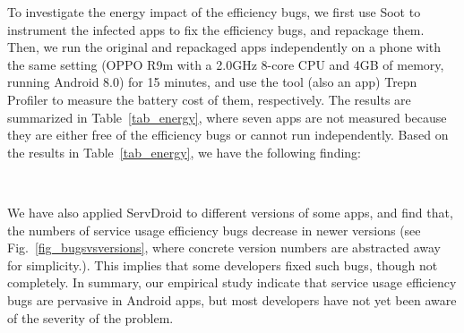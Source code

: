 \documentclass[conference]{IEEEtran}
\begin{document}
To investigate the energy impact of the efficiency bugs, we first use \textsf{Soot} to instrument the infected apps to fix the efficiency bugs, and repackage them. Then, we run the original and repackaged apps independently on a phone with the same setting (OPPO R9m with a 2.0GHz 8-core CPU and 4GB of memory, running Android 8.0) for 15 minutes, and use the tool (also an app) \textsf{Trepn Profiler} to measure the battery cost of them, respectively. The results are summarized in Table~\ref{tab_energy}, where seven apps are not measured because they are either free of the efficiency bugs or cannot run independently. Based on the results in Table~\ref{tab_energy}, we have the following finding:

\medskip
{\setlength{\parindent}{0 em}
}\\
\medskip

We have also applied \textsf{ServDroid} to different versions of some apps, and find that, the numbers of service usage efficiency bugs decrease in newer versions (see Fig.~\ref{fig_bugsvsversions}, where concrete version numbers are abstracted away for simplicity.). This implies that some developers fixed such bugs, though not completely. In summary, our empirical study indicate that service usage efficiency bugs are pervasive in Android apps, but most developers have not yet been aware of the severity of the problem.
\end{document}
